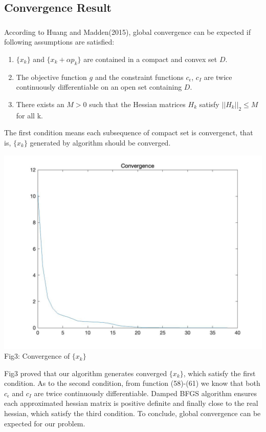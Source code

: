 \documentclass{article}
\newcommand{\upcite}[1]{\textsuperscript{\textsuperscript{\cite{#1}}}}
\begin{document}
\begin{spacing}{1.5}
\subsection{Convergence Result}
According to Huang and Madden(2015)\upcite{Ref4},  global convergence can be expected if following assumptions are satisfied:
\begin{enumerate}
\item $\{x_k\}$ and $\{x_k+\alpha p_k\}$ are contained in a compact and convex set $D$.
\item The objective function $g$ and the constraint functions $c_\epsilon$, $c_I$ are twice continuously differentiable on an open set containing $D$.
\item There exists an $M>0$ such that the Hessian matrices $H_k$ satisfy $||H_k||_2\le M$ for all k.
\end{enumerate}
The first condition means each subsequence of compact set is convergenct, that is, $\{x_k\}$ generated by algorithm should be converged. 
\begin{center}
\includegraphics[width=0.9\linewidth]{convergence.jpg}\\
Fig3: Convergence of $\{x_k\}$
\end{center}
Fig3 proved that our algorithm generates converged $\{x_k\}$, which satisfy the first condition. As to the second condition, from function (58)-(61) we know that both $c_\epsilon$ and $c_I$ are twice continuously differentiable. Damped BFGS algorithm ensures each approximated hessian matrix is positive definite and finally close to the real hessian, which satisfy the third condition. To conclude, global convergence can be expected for our problem.\\


\end{spacing}
\end{document}
